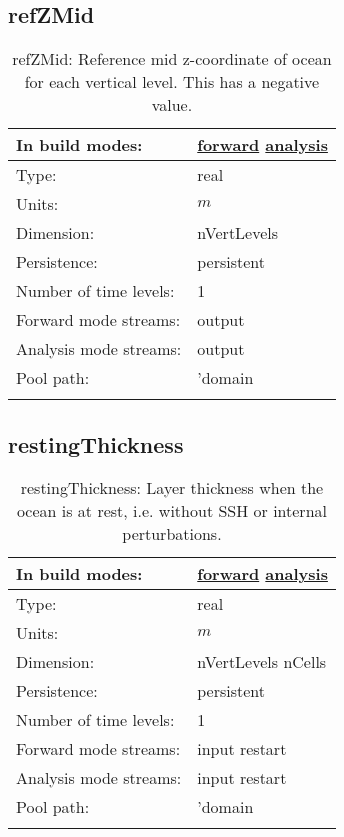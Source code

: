 \subsection[refZMid]{refZMid}
\label{subsec:var_sec_verticalMesh_refZMid}
\begin{center}
\begin{longtable}{| p{2.0in} | p{4.0in} |}
        \hline 
        In build modes: & \hyperref[subsec:forward_var_tab_verticalMesh]{forward} \hyperref[subsec:analysis_var_tab_verticalMesh]{analysis} \\
        \hline 
        Type: & real \\
        \hline 
        Units: & $m$ \\
        \hline 
        Dimension: & nVertLevels \\
        \hline 
        Persistence: & persistent \\
        \hline 
        Number of time levels: & 1 \\
        \hline 
		 Forward mode streams: &  output \\
        \hline 
		 Analysis mode streams: &  output \\
        \hline 
            Pool path: & 'domain %
 \\
		 \hline 
    \caption{refZMid: Reference mid z-coordinate of ocean for each vertical level.  This has a negative value.}
\end{longtable}
\end{center}
\subsection[restingThickness]{restingThickness}
\label{subsec:var_sec_verticalMesh_restingThickness}
\begin{center}
\begin{longtable}{| p{2.0in} | p{4.0in} |}
        \hline 
        In build modes: & \hyperref[subsec:forward_var_tab_verticalMesh]{forward} \hyperref[subsec:analysis_var_tab_verticalMesh]{analysis} \\
        \hline 
        Type: & real \\
        \hline 
        Units: & $m$ \\
        \hline 
        Dimension: & nVertLevels nCells \\
        \hline 
        Persistence: & persistent \\
        \hline 
        Number of time levels: & 1 \\
        \hline 
		 Forward mode streams: &  input restart \\
        \hline 
		 Analysis mode streams: &  input restart \\
        \hline 
            Pool path: & 'domain %
 \\
		 \hline 
    \caption{restingThickness: Layer thickness when the ocean is at rest, i.e. without SSH or internal perturbations.}
\end{longtable}
\end{center}
